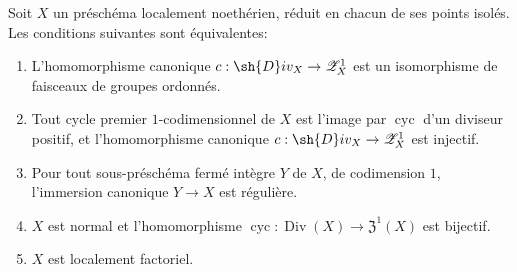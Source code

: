 \begin{proposition}[21.7.4]
\label{IV.21.7.4}
Soit $X$ un préschéma localement noethérien, réduit en chacun de ses points isolés.
Les conditions suivantes sont équivalentes:
\begin{enumerate}
  \item[\emph{a)}] L'homomorphisme canonique $c:\sh{D}iv_X\to\mathscr{Z}_X^1$  est un isomorphisme de faisceaux de groupes ordonnés.
  \item[\emph{a$'$)}] Tout cycle premier $1$-codimensionnel de $X$ est l'image par $\operatorname{cyc}$ d'un diviseur positif, et l'homomorphisme canonique $c:\sh{D}iv_X\to\mathscr{Z}_X^1$ est injectif.
  \item[\emph{a$''$)}] Pour tout sous-préschéma fermé intègre $Y$ de $X$, de codimension $1$, l'immersion canonique $Y\to X$ est régulière.
  \item[\emph{b)}] $X$ est normal et l'homomorphisme $\operatorname{cyc}:\operatorname{Div}(X)\to\mathfrak{Z}^1(X)$ est bijectif.
  \item[\emph{c)}] $X$ est localement factoriel.
\end{enumerate}
\end{proposition}


